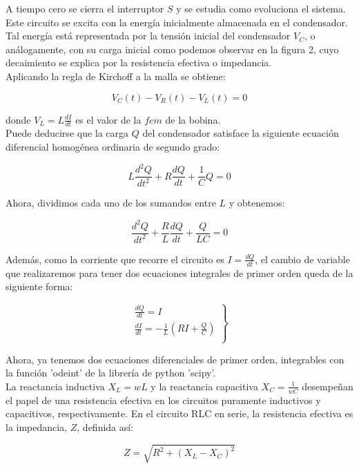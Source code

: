 \documentclass{article}
\begin{document}
    A tiempo cero se cierra el interruptor $S$ y se estudia como evoluciona el sistema. Este circuito se excita con la energía inicialmente almacenada en el condensador. Tal energía está representada por la tensión inicial del condensador $V_C$, o análogamente, con su carga inicial como podemos observar en la figura 2, cuyo decaimiento se explica por la resistencia efectiva o impedancia.\\
    
    Aplicando la regla de Kirchoff a la malla se obtiene:
    
    \[V_C(t)-V_R(t)-V_L(t)= 0\]
    
    donde $V_L = L \frac{dI}{dt}$ es el valor de la $fem$ de la bobina. \\
    
    Puede deducirse que la carga $Q$ del condensador satisface la siguiente ecuación diferencial homogénea ordinaria de segundo grado:
    
    \[L \frac{d^{2}Q}{dt^2}+R \frac{dQ}{dt}+ \frac{1}{C}Q=0\]
    
    Ahora, dividimos cada uno de los sumandos entre $L$ y obtenemos:
    
    \[ \frac{d^{2}Q}{dt^2}+\frac{R}{L} \frac{dQ}{dt}+ \frac{Q}{LC}=0\]
    
    Además, como la corriente que recorre el circuito es $ I= \frac{dQ}{dt}$, el cambio de variable que realizaremos para tener dos ecuaciones integrales de primer orden queda de la siguiente forma:
    
    \[
    \left.
    \begin{array}{rcl}
    \frac{dQ}{dt}=I\\
    \frac{dI}{dt}=-\frac{1}{L}(RI +\frac{Q}{C})\\
    \end{array}
    \right\}
    \]
    
    Ahora, ya tenemos dos ecuaciones diferenciales de primer orden, integrables con la función 'odeint' de la librería de python 'scipy'.\\
    
    La reactancia inductiva $X_L=wL $ y la reactancia capacitiva $X_C = \frac{1}{wC}$ desempeñan el papel de una resistencia efectiva en los circuitos puramente inductivos y capacitivos, respectivamente. En el circuito RLC en serie, la resistencia efectiva es la impedancia, $Z$, definida así:
    
    $$Z=\sqrt{R^2+(X_L-X_C)^2} $$
    \hfill
    
\clearpage
    
\end{document}
